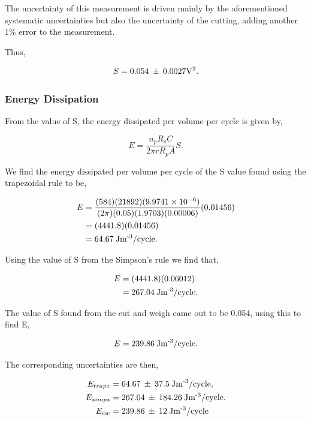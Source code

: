 \documentclass{article}
\begin{document}
The uncertainty of this measurement is driven mainly by the aforementioned systematic uncertainties
but also the uncertainty of the cutting, adding another 1\% error to the measurement.

Thus,

\begin{equation}
    S = 0.054 \: \pm \: 0.0027 \text{V\textsuperscript{2}}.
\end{equation}

\subsubsection{Energy Dissipation}
From the value of S, the energy dissipated per volume per cycle is given by,

\begin{equation}
    E = \frac{n_p R_s C}{2\pi r R_pA}S.
\end{equation}

We find the energy dissipated per volume per cycle of the S value found using the trapezoidal rule
to be,

\begin{equation}
    \begin{split}
        E &= \frac{(584)(21892)(9.9741\times 10^{-6})}{(2\pi)(0.05)(1.9703)(0.00006)}(0.01456) \\
        &= (4441.8)(0.01456) \\
        &= 64.67 \: \text{Jm\textsuperscript{-3}/cycle}.
    \end{split}
\end{equation}

Using the value of S from the Simpson's rule we find that,

\begin{equation}
    \begin{split}
        E &= (4441.8)(0.06012) \\
        &= 267.04 \: \text{Jm\textsuperscript{-3}/cycle.}
    \end{split}
\end{equation}

The value of S found from the cut and weigh came out to be 0.054, using this to find E,

\begin{equation}
    E = 239.86 \: \text{Jm\textsuperscript{-3}/cycle}.
\end{equation}

The corresponding uncertainties are then, 

\begin{equation}
    \begin{split}
    E_{trapz} &= 64.67 \: \pm \: 37.5\: \text{Jm\textsuperscript{-3}/cycle}, \\
    E_{simps} &= 267.04 \: \pm \: 184.26 \: \text{Jm\textsuperscript{-3}/cycle}. \\  
    E_{cw} &= 239.86 \: \pm \: 12 \: \text{Jm\textsuperscript{-3}/cycle}
    \end{split}
\end{equation}
\end{document}
